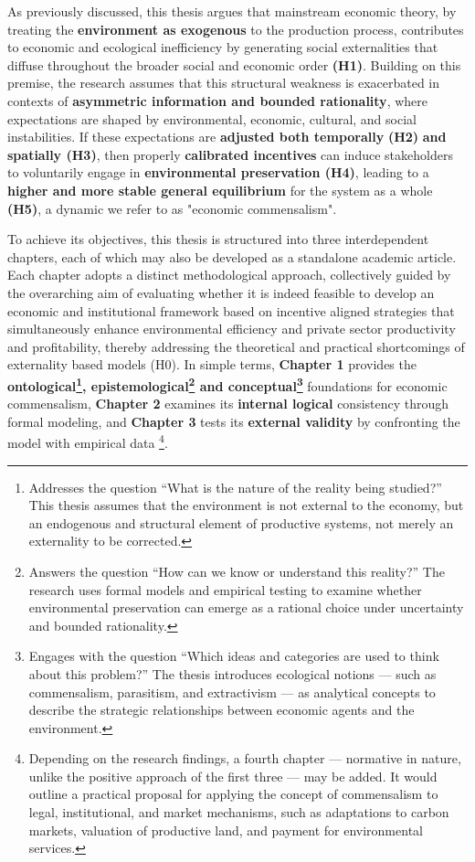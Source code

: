 As previously discussed, this thesis argues that mainstream economic theory, by treating the \textbf{environment as exogenous} to the production process, contributes to economic and ecological inefficiency by generating social externalities that diffuse throughout the broader social and economic order \textbf{(H1)}. Building on this premise, the research assumes that this structural weakness is exacerbated in contexts of \textbf{asymmetric information and bounded rationality}, where expectations are shaped by environmental, economic, cultural, and social instabilities. If these expectations are\textbf{ adjusted both temporally} \textbf{(H2)}\textbf{ and spatially (H3)}, then properly \textbf{calibrated incentives} can induce stakeholders to voluntarily engage in \textbf{environmental preservation (H4)}, leading to a \textbf{higher and more stable general equilibrium} for the system as a whole \textbf{(H5)}, a dynamic we refer to as "economic commensalism".

To achieve its objectives, this thesis is structured into three interdependent chapters, each of which may also be developed as a standalone academic article. Each chapter adopts a distinct methodological approach, collectively guided by the overarching aim of evaluating whether it is indeed feasible to develop an economic and institutional framework based on incentive aligned strategies that simultaneously enhance environmental efficiency and private sector productivity and profitability, thereby addressing the theoretical and practical shortcomings of externality based models (H0). In simple terms, \textbf{Chapter 1} provides the \textbf{ontological\footnote{Addresses the question “What is the nature of the reality being studied?” This thesis assumes that the environment is not external to the economy, but an endogenous and structural element of productive systems, not merely an externality to be corrected.}, epistemological\footnote{Answers the question “How can we know or understand this reality?” The research uses formal models and empirical testing to examine whether environmental preservation can emerge as a rational choice under uncertainty and bounded rationality.} and conceptual\footnote{Engages with the question “Which ideas and categories are used to think about this problem?” The thesis introduces ecological notions — such as commensalism, parasitism, and extractivism — as analytical concepts to describe the strategic relationships between economic agents and the environment.}} foundations for economic commensalism, \textbf{Chapter 2} examines its \textbf{internal logical} consistency through formal modeling, and \textbf{Chapter 3} tests its \textbf{external validity} by confronting the model with empirical data \footnote{Depending on the research findings, a fourth chapter — normative in nature, unlike the positive approach of the first three — may be added. It would outline a practical proposal for applying the concept of commensalism to legal, institutional, and market mechanisms, such as adaptations to carbon markets, valuation of productive land, and payment for environmental services.}.

